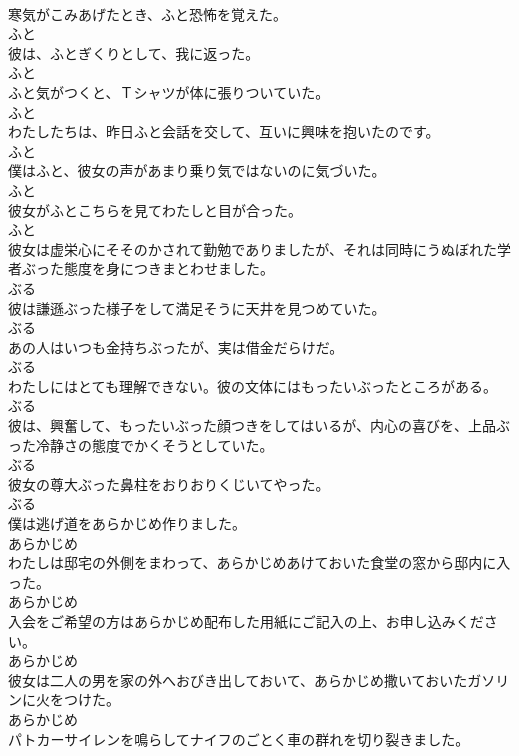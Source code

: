 \documentclass[8pt]{extreport}
\begin{document}
\begin{CJK}{UTF8}{min}
\\	寒気がこみあげたとき、ふと恐怖を覚えた。	
\\	ふと	
\\	彼は、ふとぎくりとして、我に返った。	
\\	ふと	
\\	ふと気がつくと、Ｔシャツが体に張りついていた。	
\\	ふと	
\\	わたしたちは、昨日ふと会話を交して、互いに興味を抱いたのです。	
\\	ふと	
\\	僕はふと、彼女の声があまり乗り気ではないのに気づいた。	
\\	ふと	
\\	彼女がふとこちらを見てわたしと目が合った。	
\\	ふと	
\\	彼女は虚栄心にそそのかされて勤勉でありましたが、それは同時にうぬぼれた学者ぶった態度を身につきまとわせました。	
\\	ぶる	
\\	彼は謙遜ぶった様子をして満足そうに天井を見つめていた。	
\\	ぶる	
\\	あの人はいつも金持ちぶったが、実は借金だらけだ。	
\\	ぶる	
\\	わたしにはとても理解できない。彼の文体にはもったいぶったところがある。	
\\	ぶる	
\\	彼は、興奮して、もったいぶった顔つきをしてはいるが、内心の喜びを、上品ぶった冷静さの態度でかくそうとしていた。	
\\	ぶる	
\\	彼女の尊大ぶった鼻柱をおりおりくじいてやった。	
\\	ぶる	
\\	僕は逃げ道をあらかじめ作りました。	
\\	あらかじめ	
\\	わたしは邸宅の外側をまわって、あらかじめあけておいた食堂の窓から邸内に入った。	
\\	あらかじめ	
\\	入会をご希望の方はあらかじめ配布した用紙にご記入の上、お申し込みください。	
\\	あらかじめ	
\\	彼女は二人の男を家の外へおびき出しておいて、あらかじめ撒いておいたガソリンに火をつけた。	
\\	あらかじめ	
\\	パトカーサイレンを鳴らしてナイフのごとく車の群れを切り裂きました。	

\end{CJK}
\end{document}
